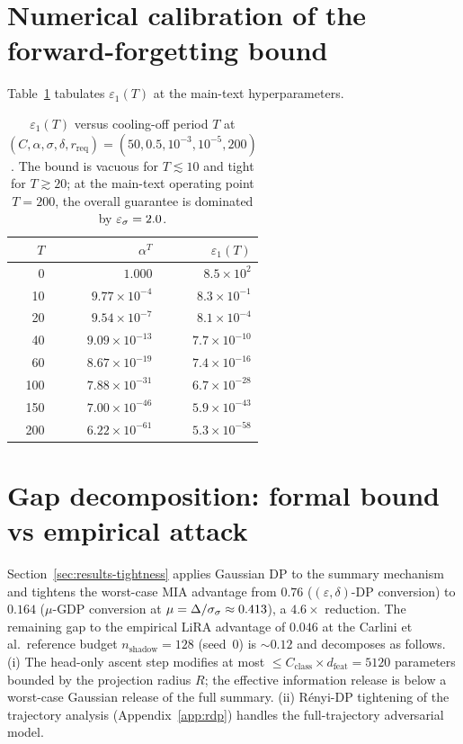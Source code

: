 \section{Numerical calibration of the forward-forgetting bound}
\label{app:numerical}

Table~\ref{tab:eps-of-T} tabulates $\varepsilon_1(T)$ at the main-text
hyperparameters.

\begin{table}[h]
\centering
\small
\begin{tabular}{rrr}
\toprule
$T$ & $\alpha^T$              & $\varepsilon_1(T)$ \\
\midrule
   0 & $1.000$                 & $8.5\times 10^{2}$ \\
  10 & $9.77\times 10^{-4}$    & $8.3\times 10^{-1}$ \\
  20 & $9.54\times 10^{-7}$    & $8.1\times 10^{-4}$ \\
  40 & $9.09\times 10^{-13}$   & $7.7\times 10^{-10}$ \\
  60 & $8.67\times 10^{-19}$   & $7.4\times 10^{-16}$ \\
 100 & $7.88\times 10^{-31}$   & $6.7\times 10^{-28}$ \\
 150 & $7.00\times 10^{-46}$   & $5.9\times 10^{-43}$ \\
 200 & $6.22\times 10^{-61}$   & $5.3\times 10^{-58}$ \\
\bottomrule
\end{tabular}
\caption{$\varepsilon_1(T)$ versus cooling-off period $T$ at $(C, \alpha, \sigma,
\delta, r_\mathrm{req}) = (50, 0.5, 10^{-3}, 10^{-5}, 200)$. The bound is vacuous
for $T \lesssim 10$ and tight for $T \gtrsim 20$; at the main-text operating point
$T{=}200$, the overall guarantee is dominated by $\varepsilon_\sigma = 2.0$.}
\label{tab:eps-of-T}
\end{table}

\section{Gap decomposition: formal bound vs empirical attack}
\label{app:gap}

Section~\ref{sec:results-tightness} applies Gaussian DP \cite{dong2019gaussian} to
the summary mechanism and tightens the worst-case MIA advantage from $0.76$
($(\varepsilon,\delta)$-DP conversion) to $0.164$ ($\mu$-GDP conversion at
$\mu = \Delta/\sigma_\sigma \approx 0.413$), a $4.6\times$ reduction. The
remaining gap to the empirical LiRA advantage of $0.046$ at the Carlini et al.\
reference budget $n_\mathrm{shadow}{=}128$ (seed~0) is $\sim 0.12$ and decomposes
as follows. (i) The head-only ascent step modifies at most $\le C_\mathrm{class}
\times d_\mathrm{feat} = 5120$ parameters bounded by the projection radius $R$;
the effective information release is below a worst-case Gaussian release of the
full summary. (ii) R\'enyi-DP tightening of the trajectory analysis
(Appendix~\ref{app:rdp}) handles the full-trajectory adversarial model.
